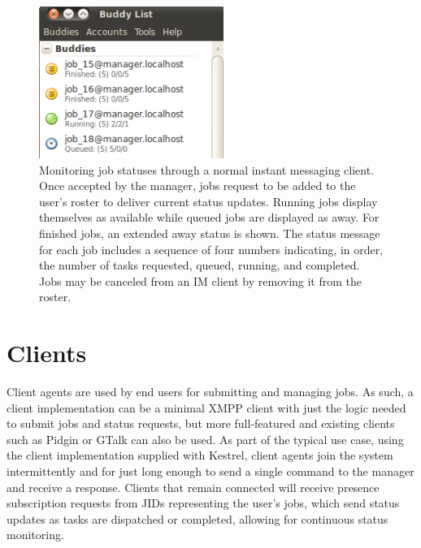 \begin{figure}
\begin{centering}
\includegraphics[width=6cm]{figures/im_client}
\end{centering}
\caption{\label{fig:IM-Client} Monitoring job statuses through a normal instant
messaging client. Once accepted by the manager, jobs request to be
added to the user's roster to deliver current status updates. Running
jobs display themselves as available while queued jobs are displayed
as away. For finished jobs, an extended away status is shown. The
status message for each job includes a sequence of four numbers indicating,
in order, the number of tasks requested, queued, running, and completed.
Jobs may be canceled from an IM client by removing it from the roster.}
\end{figure}

\section{Clients}
Client agents are used by end users for submitting and managing jobs. As such,
a client implementation can be a minimal XMPP client with just the logic needed
to submit jobs and status requests, but more full-featured and existing clients
such as Pidgin \cite{Pidgin} or GTalk \cite{GTalk} can also be used. As part of
the typical use case, using the client implementation supplied with Kestrel,
client agents join the system intermittently and for just long enough to send a
single command to the manager and receive a response. Clients that remain connected
will receive presence subscription requests from JIDs representing the user's jobs,
which send status updates as tasks are dispatched or completed, allowing for 
continuous status monitoring.

